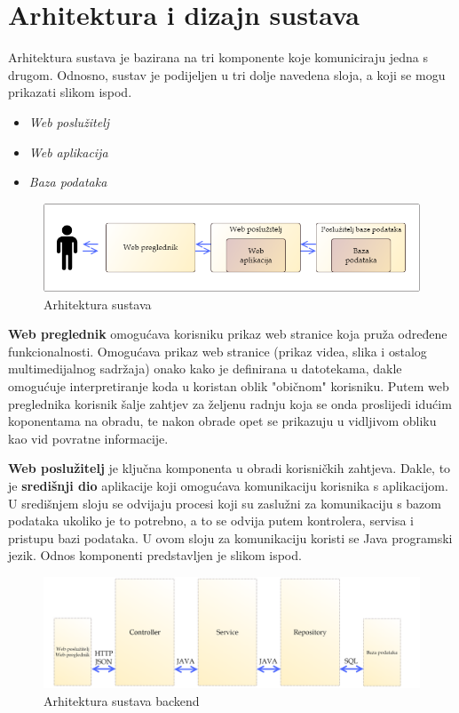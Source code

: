 \chapter{Arhitektura i dizajn sustava}

\textnormal{Arhitektura sustava je bazirana na tri komponente koje komuniciraju jedna s drugom. Odnosno, sustav je podijeljen u tri dolje navedena sloja, a koji se mogu prikazati slikom ispod.}
\begin{itemize}
	\item 	\textit{Web poslužitelj}
	\item 	\textit{Web aplikacija}
	\item 	\textit{Baza podataka}
\end{itemize}

\begin{figure}[H]
	\includegraphics[width=\textwidth]{slike/arhitekturaSustava.png} %
	\centering
	\caption{Arhitektura sustava}
	\label{fig:arhitekturasustava}
\end{figure}

\textnormal{\textbf{Web preglednik} omogućava korisniku prikaz web stranice koja pruža određene funkcionalnosti. Omogućava prikaz web stranice (prikaz videa, slika i ostalog multimedijalnog sadržaja) onako kako je definirana u datotekama, dakle omogućuje interpretiranje koda u koristan oblik "običnom" korisniku.
	Putem web preglednika korisnik šalje zahtjev za željenu radnju koja se onda proslijedi idućim koponentama na obradu, te nakon obrade opet se prikazuju u vidljivom obliku kao vid povratne informacije.}

\textnormal{\textbf{Web poslužitelj} je ključna komponenta u obradi korisničkih zahtjeva.
	Dakle, to je \textbf{središnji dio} aplikacije koji omogućava komunikaciju korisnika s aplikacijom.
	U središnjem sloju se odvijaju procesi koji su zaslužni za komunikaciju s bazom podataka ukoliko je to potrebno,
	a to se odvija putem kontrolera, servisa i pristupu bazi podataka.
	U ovom sloju za komunikaciju koristi se Java programski jezik. Odnos komponenti predstavljen je slikom ispod.}

\begin{figure}[H]
	\includegraphics[width=\textwidth]{slike/arhitekturaSustava2.png} %
	\centering
	\caption{Arhitektura sustava backend}
	\label{fig:arhitekturasustava2}
\end{figure}

